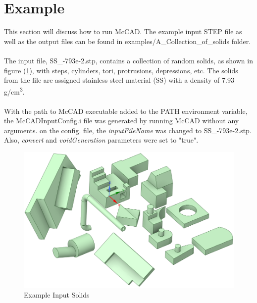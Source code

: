 \documentclass[letterpaper, 12 pt]{report}
\begin{document}
\section{Example} \label{sec:example}
This section will discuss how to run McCAD. The example input STEP file as well as the output files can be found in examples/A\_Collection\_of\_solids folder. \\
\\
The input file, SS\_-793e-2.stp, contains a collection of random solids, as shown in figure (\ref{fig:ExampleSolids}), with steps, cylinders, tori, protrusions, depressions, etc. The solids from the file are assigned stainless steel material (SS) with a density of 7.93 g/cm\textsuperscript{3}. \\
\\
With the path to McCAD executable added to the PATH environment variable, the McCADInputConfig.i file was generated by running McCAD without any arguments. on the config. file, the \emph{inputFileName} was changed to SS\_-793e-2.stp. Also, \emph{convert} and \emph{voidGeneration} parameters were set to "true".
\begin{figure}[h]
	\centering
	\includegraphics[scale=0.5]{figures/InputSolids.png}
	\caption{Example Input Solids}
	\label{fig:ExampleSolids}
\end{figure}
\end{document}

